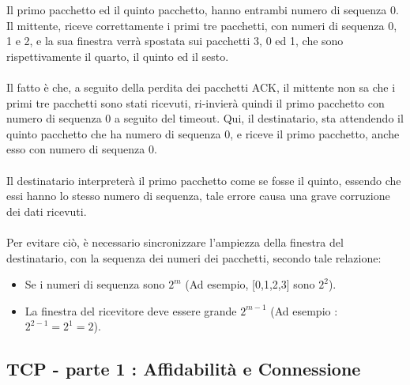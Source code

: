 \documentclass[12pt, letterpaper]{article}
\newcommand{\acc}{\\\hphantom{}\\}
\begin{document}
Il primo pacchetto ed il quinto pacchetto, hanno entrambi numero di sequenza 0. Il mittente, riceve correttamente
i primi tre pacchetti, con numeri di sequenza 0, 1 e 2, e la sua finestra verrà spostata sui pacchetti 
3, 0 ed 1, che sono rispettivamente il quarto, il quinto ed il sesto.\acc 
Il fatto è che, a seguito della perdita dei pacchetti ACK, il mittente non sa che i primi tre pacchetti sono stati 
ricevuti, ri-invierà quindi il primo pacchetto con numero di sequenza 0 a seguito del timeout. Qui, il destinatario, 
sta attendendo il quinto pacchetto che ha numero di sequenza 0, e riceve il primo pacchetto, anche esso con numero di 
sequenza 0.\acc 
Il destinatario interpreterà il primo pacchetto come se fosse il quinto, essendo che essi hanno lo stesso numero di 
sequenza, tale errore causa una grave corruzione dei dati ricevuti.\acc 
Per evitare ciò, è necessario sincronizzare l'ampiezza della finestra del destinatario, con la sequenza dei 
numeri dei pacchetti, secondo tale relazione: \begin{itemize}
    \item Se i numeri di sequenza sono $2^m$ (Ad esempio, [0,1,2,3] sono $2^2$).
    \item La finestra del ricevitore deve essere grande $2^{m-1}$ (Ad esempio : $2^{2-1}=2^1=2$).
\end{itemize}
\subsection{TCP - parte 1 : Affidabilità e Connessione}
\end{document}
